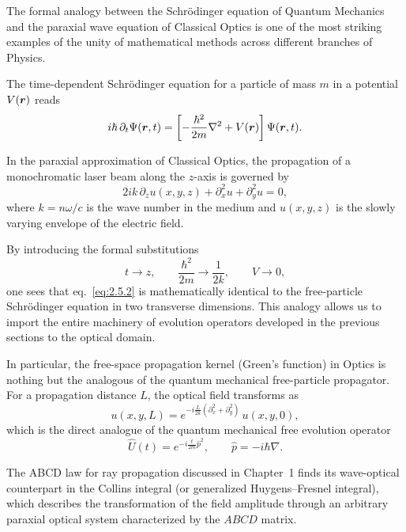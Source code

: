 The formal analogy between the Schr\"odinger equation of Quantum Mechanics and the paraxial wave equation of Classical Optics is one of the most striking examples of the unity of mathematical methods across different branches of Physics.

The time-dependent Schr\"odinger equation for a particle of mass $m$ in a potential $V(\bm{r})$ reads
\begin{equation}
i\hbar\,\partial_{t}\Psi(\bm{r},t)
=\left[-\frac{\hbar^{2}}{2m}\nabla^{2}+V(\bm{r})\right]\Psi(\bm{r},t).
\label{eq:2.5.1}
\end{equation}

In the paraxial approximation of Classical Optics, the propagation of a monochromatic laser beam along the $z$-axis is governed by
\begin{equation}
2ik\,\partial_{z}u(x,y,z)+\partial_{x}^{2}u+\partial_{y}^{2}u=0,
\label{eq:2.5.2}
\end{equation}
where $k=n\omega/c$ is the wave number in the medium and $u(x,y,z)$ is the slowly varying envelope of the electric field.

By introducing the formal substitutions
\begin{equation}
t\rightarrow z,\qquad
\frac{\hbar^{2}}{2m}\rightarrow\frac{1}{2k},\qquad
V\rightarrow 0,
\label{eq:2.5.3}
\end{equation}
one sees that eq.~\eqref{eq:2.5.2} is mathematically identical to the free-particle Schr\"odinger equation in two transverse dimensions. This analogy allows us to import the entire machinery of evolution operators developed in the previous sections to the optical domain.

In particular, the free-space propagation kernel (Green's function) in Optics is nothing but the analogous of the quantum mechanical free-particle propagator. For a propagation distance $L$, the optical field transforms as
\begin{equation}
u(x,y,L)=e^{-i\frac{L}{2k}(\partial_{x}^{2}+\partial_{y}^{2})}\,u(x,y,0),
\label{eq:2.5.4}
\end{equation}
which is the direct analogue of the quantum mechanical free evolution operator
\begin{equation}
\hat{U}(t)=e^{-i\frac{t}{2m}\hat{p}^{2}},\qquad \hat{p}=-i\hbar\nabla.
\label{eq:2.5.5}
\end{equation}

The ABCD law for ray propagation discussed in Chapter~1 finds its wave-optical counterpart in the Collins integral (or generalized Huygens--Fresnel integral), which describes the transformation of the field amplitude through an arbitrary paraxial optical system characterized by the $ABCD$ matrix.

